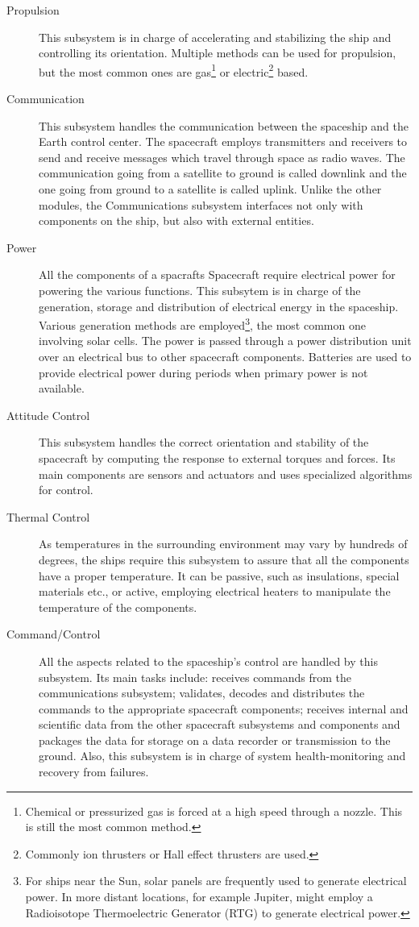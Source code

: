 \begin{description}
  \item[Propulsion] This subsystem is in charge of accelerating and stabilizing
  the ship and controlling its orientation. Multiple methods can be used for
  propulsion, but the most common ones are gas\footnote{Chemical or pressurized
  gas is forced at a high speed through a nozzle. This is still the most common
  method.} or electric\footnote{Commonly ion thrusters or Hall effect thrusters
  are used.} based.
  \item[Communication] This subsystem handles the communication between the
  spaceship and the Earth control center. The spacecraft employs transmitters
  and receivers to send and receive messages which travel through space as radio
  waves. The communication going from a satellite to ground is called downlink
  and the one going from ground to a satellite is called uplink. Unlike the
  other modules, the Communications subsystem interfaces not only with
  components on the ship, but also with external entities.
  \item[Power] All the components of a spacrafts Spacecraft require electrical
  power for powering the various functions. This subsytem is in charge of the
  generation, storage and distribution of electrical energy in the spaceship.
  Various generation methods are employed\footnote{ For ships near the Sun,
  solar panels are frequently used to generate electrical power. In more distant
  locations, for example Jupiter, might employ a Radioisotope Thermoelectric
  Generator (RTG) to generate electrical power.}, the most common one involving
  solar cells. The power is passed through a power distribution unit over an
  electrical bus to other spacecraft components. Batteries are used to provide
  electrical power during periods when primary power is not available.
  \item[Attitude Control] This subsystem handles the correct orientation and
  stability of the spacecraft by computing the response to external torques and
  forces. Its main components are sensors and actuators and uses specialized
  algorithms for control.
  \item[Thermal Control] As temperatures in the surrounding environment may vary
  by hundreds of degrees, the ships require this subsystem to assure that all
  the components have a proper temperature. It can be passive, such as
  insulations, special materials etc., or active, employing electrical heaters
  to manipulate the temperature of the components.
  \item[Command/Control] All the aspects related to the spaceship's control are
  handled by this subsystem. Its main tasks include: receives commands from
  the communications subsystem; validates, decodes and distributes the commands
  to the appropriate spacecraft components; receives internal and scientific
  data from the other spacecraft subsystems and components and packages the data
  for storage on a data recorder or transmission to the ground. Also, this
  subsystem is in charge of system health-monitoring and recovery from failures.
\end{description}

